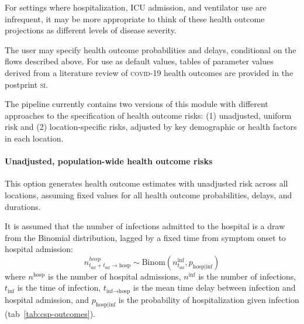{For settings where hospitalization, ICU admission, and ventilator use are infrequent, it may be more appropriate to think of these health outcome projections as different levels of disease severity.

The user may specify health outcome probabilities and delays, conditional on the flows described above. For use as default values, tables of parameter values derived from a literature review of \textsc{covid}-19 health outcomes are provided in the postprint \textsc{si}.

The pipeline currently contains two versions of this module with different approaches to the specification of health outcome risks: (1) unadjusted, uniform risk and (2) location-specific risks, adjusted by key demographic or health factors in each location.

\paragraph{Unadjusted, population-wide health outcome risks}
This option generates health outcome estimates with unadjusted risk across all locations, assuming fixed values for all health outcome probabilities, delays, and durations.

It is assumed that the number of infections admitted to the hospital is a draw from the Binomial distribution, lagged by a fixed time from symptom onset to hospital admission:
\begin{equation}
n_{t_\text{inf} + t_\text{inf} \to \text{hosp}}^{hosp} \sim \text{Binom}\left(n_{t_\text{inf}}^\text{inf}, p_{\text{hosp}\mid \text{inf}} \right)
\end{equation}
where $n^\text{hosp}$ is the number of hospital admissions, $n^\text{inf}$ is the number of infections, $t_\text{inf}$ is the time of infection, $t_{\text{inf} \to \text{hosp}}$ is the mean time delay between infection and hospital admission, and $p_{\text{hosp} \mid \text{inf}}$ is the probability of hospitalization given infection (tab~\ref{tab:csp-outcomes}).

}
